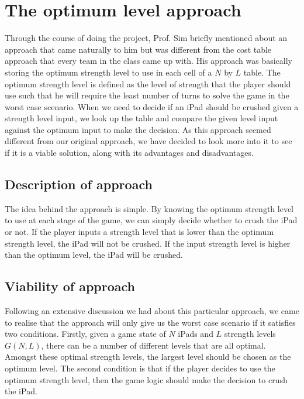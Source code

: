 \documentclass[12pt,a4paper,oneside]{report}
\begin{document}

\chapter{The optimum level approach}
Through the course of doing the project, Prof. Sim briefly mentioned about an approach that came naturally to him but was different from the cost table approach that every team in the class came up with. His approach was basically storing the optimum strength level to use in each cell of a $N$ by $L$ table. The optimum strength level is defined as the level of strength that the player should use such that he will require the least number of turns to solve the game in the worst case scenario. When we need to decide if an iPad should be crushed given a strength level input, we look up the table and compare the given level input against the optimum input to make the decision. As this approach seemed different from our original approach, we have decided to look more into it to see if it is a viable solution, along with its advantages and disadvantages.

\section{Description of approach}
The idea behind the approach is simple. By knowing the optimum strength level to use at each stage of the game, we can simply decide whether to crush the iPad or not. If the player inputs a strength level that is lower than the optimum strength level, the iPad will not be crushed. If the input strength level is higher than the optimum level, the iPad will be crushed.

\section{Viability of approach}
Following an extensive discussion we had about this particular approach, we came to realise that the approach will only give us the worst case scenario if it satisfies two conditions. Firstly, given a game state of $N$ iPads and $L$ strength levels $G(N,L)$, there can be a number of different levels that are all optimal. Amongst these optimal strength levels, the largest level should be chosen as the optimum level. The second condition is that if the player decides to use the optimum strength level, then the game logic should make the decision to crush the iPad.
\end{document}

